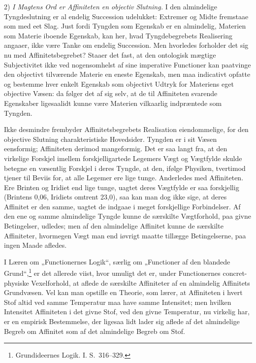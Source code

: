 \documentclass[12pt]{book}
\newcommand{\opage}[1]{\marginnote{\footnotesize\textit{[#1]}}}
\begin{document}
2) \emph{I Magtens Ord er Affiniteten en objectiv Slutning.} I den almindelige Tyngdeslutning er al endelig Succession udelukket: Extremer og Midte fremstaae som med eet Slag. Just fordi Tyngden som Egenskab er en almindelig, Materien som Materie iboende Egenskab, kan her, hvad Tyngdebegrebets Realisering angaaer, ikke være Tanke om endelig Succession. Men hvorledes forholder det sig nu med Affinitetsbegrebet? Staaer det fast, at den ontologisk mægtige Subjectivitet ikke ved nogensomhelst af sine
\opage{415}imperative Functioner kan paatvinge den objectivt tilværende Materie en eneste Egenskab, men maa indicativt opfatte og bestemme hver enkelt Egenskab som objectivt Udtryk for Materiens eget objective Væsen: da følger det af sig selv, at de til Affiniteten svarende Egenskaber ligesaalidt kunne være Materien vilkaarlig indpræntede som Tyngden.

Ikke desmindre frembyder Affinitetsbegrebets Realisation eiendommelige, for den objective Slutning charakteristiske Hovedsider. Tyngden er i sit Væsen eensformig; Affiniteten derimod mangeformig. Det er saa langt fra, at den virkelige Forskjel imellem forskjelligartede Legemers Vægt og Vægtfylde skulde betegne en væsentlig Forskjel i deres Tyngde, at den, ifølge Physiken, tvertimod tjener til Beviis for, at alle Legemer ere lige tunge. Anderledes med Affiniteten. Ere Brinten og Iridiet end lige tunge, uagtet deres Vægtfylde er saa forskjellig (Brintens 0,06, Iridiets omtrent 23,0), saa kan man dog ikke sige, at deres Affinitet er den samme, uagtet de indgaae i meget forskjellige Forbindelser. Af den ene og samme almindelige Tyngde kunne de særskilte Vægtforhold, paa givne Betingelser, udledes; men af den almindelige Affinitet kunne de særskilte Affiniteter, hvormegen Vægt man end iøvrigt maatte tillægge Betingelserne, paa ingen Maade afledes.

I Læren om „Functionernes Logik“, særlig om „Functioner af den blandede Grund“,\footnote{Grundideernes Logik. I. S.~316--329.}%
{} er det allerede viist, hvor umuligt det er, under Functionernes concret-physiske Vexelforhold, at aflede de særskilte Affiniteter af en almindelig Affinitets Grundvæsen. Vel kan man opstille en Theorie, som lærer, at Affiniteten i hvert Stof altid ved samme Temperatur maa have samme Intensitet; men hvilken Intensitet Affiniteten i det givne Stof, ved den givne Temperatur, nu virkelig har, er en empirisk Bestemmelse, der ligesaa
\opage{416}lidt lader sig aflede af det almindelige Begreb om Affinitet som af det almindelige Begreb om Stof.
\end{document}
